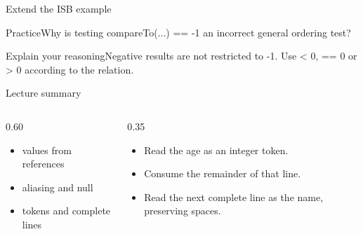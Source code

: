 \documentclass[10pt,aspectratio=169]{beamer}
\begin{document}
\begin{frame}[fragile,t]{Extend the ISB example}
\begin{alertblock}{Practice}Why is testing compareTo(...) == {-}1 an incorrect general ordering test?\end{alertblock}\vspace{3mm}\begin{exampleblock}{Explain your reasoning}Negative results are not restricted to {-}1. Use \textless{} 0, == 0 or \textgreater{} 0 according to the relation.\end{exampleblock}
\end{frame}
\begin{frame}[fragile,t]{Lecture summary}
\begin{columns}[T,onlytextwidth]\begin{column}{0.60\textwidth}
\begin{itemize}
\item values from references
\item aliasing and null
\item tokens and complete lines
\end{itemize}
\end{column}\begin{column}{0.35\textwidth}\small
\begin{itemize}
\item Read the age as an integer token.
\item Consume the remainder of that line.
\item Read the next complete line as the name, preserving spaces.
\end{itemize}
\end{column}\end{columns}
\end{frame}
\end{document}
